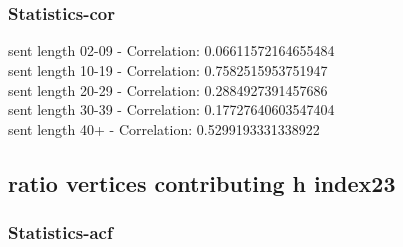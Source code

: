 \documentclass{article}%
\begin{document}
\begin{figure}[ht]%
\centering%
\setlength{\abovecaptionskip}{-35pt}%
%
%
\\%
%
%
\\%
%
\end{figure}

%
\newpage%
\subsubsection{Statistics{-}cor}%
\label{ssubsec:Statistics{-}cor}%
\noindent%
sent length 02-09 - Correlation: 0.06611572164655484\\%
sent length 10-19 - Correlation: 0.7582515953751947\\%
sent length 20-29 - Correlation: 0.2884927391457686\\%
sent length 30-39 - Correlation: 0.17727640603547404\\%
sent length 40+ - Correlation: 0.5299193331338922\\

%
\newpage

%
\subsection{ratio vertices contributing h index23}%
\label{subsec:ratioverticescontributinghindex23}%
\subsubsection{Statistics{-}acf}%
\label{ssubsec:Statistics{-}acf}%
\end{document}
